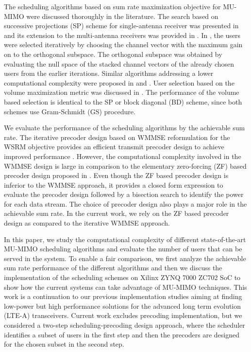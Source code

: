 \documentclass[conference,letterpaper,10pt]{./../../IEEE/IEEEtran}
\begin{document}
The scheduling algorithms based on sum rate maximization objective for MU-MIMO were discussed thoroughly in the literature. The search based on successive projections (SP) scheme for single-antenna receiver was presented in \cite{sus2006zfbf} and its extension to the multi-antenna receivers was provided in \cite{Tolli-etal-2005}. In \cite{Tolli-etal-2005}, the users were selected iteratively by choosing the channel vector with the maximum gain on to the orthogonal subspace. The orthogonal subspace was obtained by evaluating the null space of the stacked channel vectors of the already chosen users from the earlier iterations. Similar algorithms addressing a lower computational complexity were proposed in \cite{shen2006low} and \cite{youtuan2007improved}. User selection based on the volume maximization metric was discussed in \cite{jin2010novel}. The performance of the volume based selection is identical to the SP or block diagonal (BD) scheme, since both schemes use Gram-Schmidt (GS) procedure.

We evaluate the performance of the scheduling algorithms by the achievable sum rate. The iterative precoder design based on \ac{WMMSE} reformulation for the \ac{WSRM} objective provides an efficient transmit precoder design to achieve improved performance \cite{wmmse_shi}. However, the computational complexity involved in the \ac{WMMSE} design is large in comparison to the elementary zero-forcing (ZF) based precoder design proposed in \cite{spencer2004zero}. Even though the ZF based precoder design is inferior to the \ac{WMMSE} approach, it provides a closed form expression to evaluate the precoder design followed by a bisection search to identify the power for each data stream. The choice of precoder design also plays a major role in the achievable sum rate. In the current work, we rely on the ZF based precoder design as compared to the iterative WMMSE approach.

In this paper, we study the computational complexity of different state-of-the-art MU-MIMO scheduling algorithms and evaluate the number of users that can be served in the system. To enable a fair comparison, we first analyze the achievable sum rate performance of the different algorithms and then we discuss the implementation of the scheduling schemes on Xilinx ZYNQ 7000 ZC702 \ac{SoC} to show how the current systems can take advantage of MU-MIMO techniques. This work is a continuation to our previous implementation studies \cite{Janhunen-etal-11, Hanninen-etal-2014, Shahabuddin-etal-2014} aiming at finding low-power but high performance solutions for the advanced long term evolution (LTE-A) transceivers. Current work excludes precoding implementation, but we considered a two-step scheduling-precoding design approach, where the scheduler identifies a subset of users in the first step and then the precoders are designed for the chosen subset in the second step.
\end{document}
